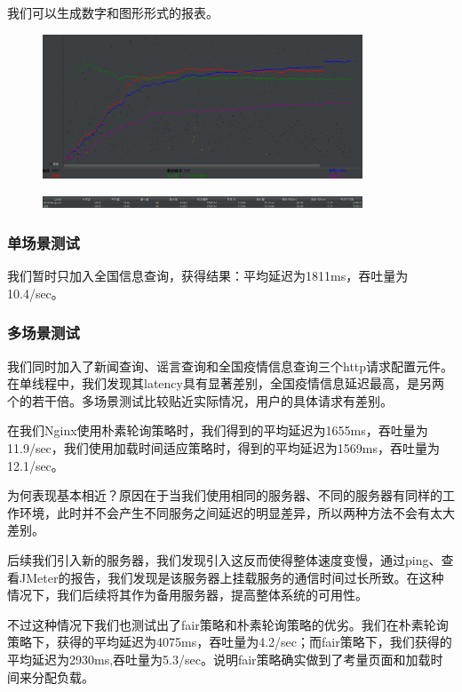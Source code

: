 \documentclass{article}
\begin{document}
我们可以生成数字和图形形式的报表。
\begin{figure}[H]
\centering
\includegraphics[width=0.85\textwidth]{graph.png}
\end{figure}
\begin{figure}[H]
\centering
\includegraphics[width=0.85\textwidth]{figure.png}
\end{figure}
\subsubsection{单场景测试}
我们暂时只加入全国信息查询，获得结果：平均延迟为1811ms，吞吐量为10.4/sec。
\subsubsection{多场景测试}
我们同时加入了新闻查询、谣言查询和全国疫情信息查询三个http请求配置元件。在单线程中，我们发现其latency具有显著差别，全国疫情信息延迟最高，是另两个的若干倍。多场景测试比较贴近实际情况，用户的具体请求有差别。

在我们Nginx使用朴素轮询策略时，我们得到的平均延迟为1655ms，吞吐量为11.9/sec，我们使用加载时间适应策略时，得到的平均延迟为1569ms，吞吐量为12.1/sec。

为何表现基本相近？原因在于当我们使用相同的服务器、不同的服务器有同样的工作环境，此时并不会产生不同服务之间延迟的明显差异，所以两种方法不会有太大差别。

后续我们引入新的服务器，我们发现引入这反而使得整体速度变慢，通过ping、查看JMeter的报告，我们发现是该服务器上挂载服务的通信时间过长所致。在这种情况下，我们后续将其作为备用服务器，提高整体系统的可用性。

不过这种情况下我们也测试出了fair策略和朴素轮询策略的优劣。我们在朴素轮询策略下，获得的平均延迟为4075ms，吞吐量为4.2/sec；而fair策略下，我们获得的平均延迟为2930ms,吞吐量为5.3/sec。说明fair策略确实做到了考量页面和加载时间来分配负载。
\end{document}
